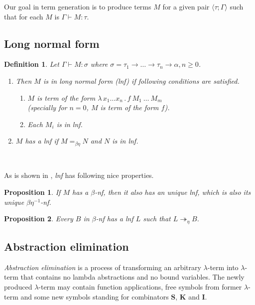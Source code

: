 \documentclass{sig-alternate}
\newtheorem{definition}{Definition}
\newtheorem{proposition}{Proposition}
\newcommand{\lterm}{$\lambda$-term\xspace}
\newcommand{\tur}[3]{#1\vdash{}#2 \colon #3}
\newcommand{\turst}[3]{$#1\vdash{}#2:#3$\xspace}
\newcommand{\GMS}{\turst{\Gamma}{M}{\sigma}}
\newcommand{\lam}[2]{\lambda \, #1 \, . \, #2}
\newcommand{\Scomb }{\mathbf{S}}
\newcommand{\Kcomb }{\mathbf{K}}
\newcommand{\Icomb }{\mathbf{I}}
\newcommand{\bnf}{$\beta$-\textit{nf}\xspace}
\newcommand{\beenf}{$\beta\eta^{-1}$-\textit{nf}\xspace}
\newcommand{\lnf}{\textit{lnf}\xspace}
\newcommand{\ar}{\rightarrow\xspace}
\newcommand{\ul}[2]{\langle #1 ; #2 \rangle}
\begin{document}
Our goal in term generation is to produce terms $M$
for a given pair $\ul{\tau}{\Gamma}$
such that for each $M$ is $\tur{\Gamma}{M}{\tau}$.

\subsection{Long normal form}
\label{lnf}


\begin{definition}
Let \GMS where 
$\sigma = \tau_1 \ar \dots \ar \tau_n \ar \alpha, n \geq 0$.
	\begin{enumerate}
	  \item	
		Then $M$ is in \textit{long normal form} (\lnf) if following 
		conditions are satisfied.
		\begin{enumerate}
		 \item $M$ is term of the form $\lam{x_1 \dots x_n}{f~M_1~\dots~M_m}$\\
		  (specially for $n = 0$, $M$ is term of the form $f$).
		 \item Each $M_i$ is in \lnf.
		\end{enumerate}	
	  \item 
	    $M$ has a \lnf if $M =_{\beta\eta} N$ and $N$ is in \lnf.
	\end{enumerate}
\end{definition}~

As is shown in \cite{barendregt10}, \lnf has following nice properties.

\begin{proposition}
If $M$ has a \bnf, 
then it also has an unique \lnf, 
which is also its unique \beenf.
\end{proposition}

\begin{proposition}
Every $B$ in \bnf has a \lnf 
$L$ such that $L \twoheadrightarrow_{\eta} B$.
\end{proposition}

\subsection{Abstraction elimination}
\textit{Abstraction elimination} is a process of transforming 
an arbitrary \lterm into \lterm that contains no lambda abstractions
and no bound variables.
The newly produced \lterm may contain function applications, 
free symbols from former \lterm and some new symbols standing for 
combinators $\Scomb$, $\Kcomb$ and $\Icomb$.
\end{document}
